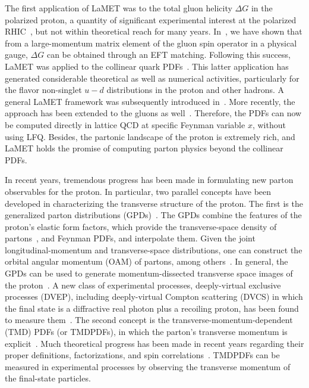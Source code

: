 \documentclass[aps,rmp,reprint,amsmath,amssymb,graphicx,longbibliography]{revtex4-1} %
\begin{document}
The first application of LaMET was to the total gluon helicity $\Delta G$ in the
polarized proton, a quantity of significant experimental interest
at the polarized RHIC~\cite{Bunce:2000uv}, but not within
theoretical reach for many years. In~\cite{Ji:2013fga}, we have shown that from a large-momentum
matrix element of the gluon spin operator in a physical gauge,
$\Delta G$ can be obtained through an EFT matching.
Following this success, LaMET
was applied to the collinear quark PDFs~\cite{Ji:2013dva}. This latter application has
generated considerable theoretical as well as numerical activities,
particularly for the flavor non-singlet $u-d$ distributions in the proton
and other hadrons. A general LaMET framework was subsequently introduced in~\cite{Ji:2014gla}.
More recently, the approach has been extended to the gluons as well~\cite{Zhang:2018diq,Li:2018tpe}.
Therefore, the PDFs can now be computed directly in lattice QCD at specific Feynman variable $x$,
without using LFQ. Besides, the partonic landscape of the proton is extremely
rich, and LaMET holds the promise of computing parton physics beyond the collinear PDFs.

In recent years, tremendous progress has been made in formulating new parton observables
for the proton. In particular, two parallel concepts have been developed
in characterizing the transverse structure of the proton. The first is the generalized
parton distributions (GPDs)~\cite{Mueller:1998fv,Ji:1996ek,Radyushkin:1998es}. The GPDs combine the features of the proton's
elastic form factors, which provide the transverse-space density of partons~\cite{Miller:2007uy},
and Feynman PDFs, and interpolate them. Given the joint
longitudinal-momentum and transverse-space distributions,
one can construct the orbital angular momentum (OAM) of partons, among others~\cite{Ji:1996ek}.
In general, the GPDs can be used to generate momentum-dissected transverse space images of the
proton~\cite{Burkardt:2000za}. A new class of experimental processes, deeply-virtual
exclusive processes (DVEP), including deeply-virtual Compton scattering (DVCS) in which the final state
is a diffractive real photon plus a recoiling proton, has been found to
measure them~\cite{Ji:1996ek,Ji:1996nm}.
The second concept is the transverse-momentum-dependent (TMD) PDFs (or TMDPDFs),
in which the parton's transverse momentum is explicit~\cite{Collins:1981uk,Collins:2011zzd}.
Much theoretical progress has been made in recent years regarding their proper definitions, factorizations,
and spin correlations~\cite{Collins:2012uy,Echevarria:2012js,Collins:2017oxh}.
TMDPDFs can be measured in experimental processes by
observing the transverse momentum of the final-state particles.
\end{document}
